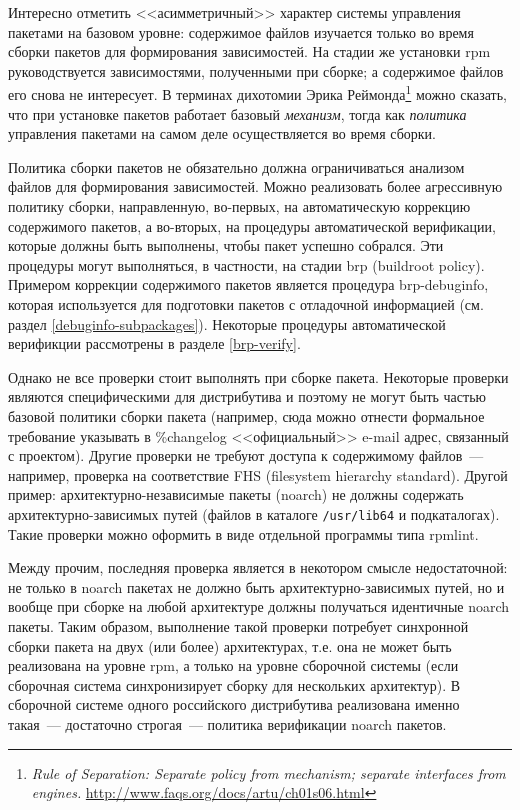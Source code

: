 \documentclass[russian,a4paper,12pt,titlepage]{article}
\begin{document}
Интересно отметить <<асимметричный>> характер системы управления пакетами на базовом уровне: содержимое
файлов изучается только во время сборки пакетов для формирования зависимостей.  На стадии же установки
rpm руководствуется зависимостями, полученными при сборке; а содержимое файлов его снова не интересует.
В терминах дихотомии Эрика Реймонда\footnote{\textit{Rule of Separation: Separate policy from mechanism;
separate interfaces from engines.} \url{http://www.faqs.org/docs/artu/ch01s06.html}}
можно сказать, что при установке пакетов работает базовый \textit{механизм}, тогда как \textit{политика}
управления пакетами на самом деле осуществляется во время сборки.

Политика сборки пакетов не обязательно должна ограничиваться анализом файлов для формирования зависимостей.
Можно реализовать более агрессивную политику сборки, направленную, во-первых, на автоматическую коррекцию содержимого
пакетов, а во-вторых, на процедуры автоматической верификации, которые должны быть выполнены, чтобы пакет успешно собрался.
Эти процедуры могут выполняться, в частности, на стадии brp (buildroot policy).  Примером коррекции содержимого
пакетов является процедура brp-debuginfo, которая используется для подготовки пакетов с отладочной информацией (см. раздел
\ref{debuginfo-subpackages}).  Некоторые процедуры автоматической верификции рассмотрены в разделе \ref{brp-verify}.

Однако не все проверки стоит выполнять при сборке пакета.  Некоторые проверки
являются специфическими для дистрибутива и поэтому не могут быть частью базовой
политики сборки пакета (например, сюда можно отнести формальное требование указывать
в \%changelog <<официальный>> e-mail адрес, связанный с проектом).  Другие проверки не требуют
доступа к содержимому файлов~--- например, проверка на соответствие FHS (filesystem hierarchy standard).
Другой пример: архитектурно-независимые пакеты (noarch) не должны содержать архитектурно-зависимых путей
(файлов в каталоге \verb|/usr/lib64| и подкаталогах).  Такие проверки можно оформить в виде отдельной программы
типа rpmlint.

Между прочим, последняя проверка является в некотором смысле недостаточной: не только в noarch пакетах не должно быть
архитектурно-зависимых путей, но и вообще при сборке на любой архитектуре должны получаться идентичные noarch пакеты.
Таким образом, выполнение такой проверки потребует синхронной сборки пакета на двух (или более) архитектурах, т.е.
она не может быть реализована на уровне rpm, а только на уровне сборочной системы (если сборочная система синхронизирует
сборку для нескольких архитектур).  В сборочной системе одного российского дистрибутива реализована именно такая~--- достаточно
строгая~--- политика верификации noarch пакетов.
\end{document}
